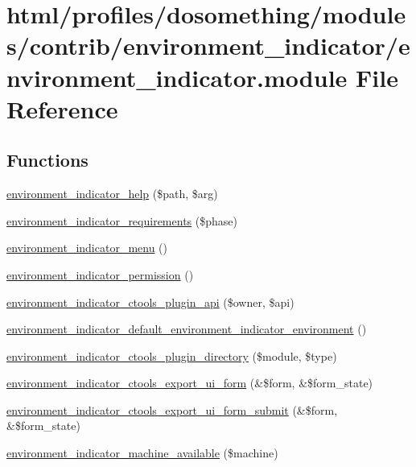 \hypertarget{environment__indicator_8module}{
\section{html/profiles/dosomething/modules/contrib/environment\_\-indicator/environment\_\-indicator.module File Reference}
\label{environment__indicator_8module}
}
\subsection*{Functions}
\begin{DoxyCompactItemize}
\item 
\hyperlink{environment__indicator_8module_adfcb16b3db44378c6a441b5fa7b551a6}{environment\_\-indicator\_\-help} (\$path, \$arg)
\item 
\hyperlink{environment__indicator_8module_ac2df292851fe032e8c1b8190b662efbb}{environment\_\-indicator\_\-requirements} (\$phase)
\item 
\hyperlink{environment__indicator_8module_a2bd8a22de9eff55b8b81e063f715c60d}{environment\_\-indicator\_\-menu} ()
\item 
\hyperlink{environment__indicator_8module_ac21e6775730d37b12c0777741024bdbb}{environment\_\-indicator\_\-permission} ()
\item 
\hyperlink{environment__indicator_8module_acd23f4e462d58e8faa7d37c70ae7c5f8}{environment\_\-indicator\_\-ctools\_\-plugin\_\-api} (\$owner, \$api)
\item 
\hyperlink{environment__indicator_8module_a2451c07621123ad9dd3ec1128c8a647b}{environment\_\-indicator\_\-default\_\-environment\_\-indicator\_\-environment} ()
\item 
\hyperlink{environment__indicator_8module_aa1ece2037e37ce2758dd6145f2f2eb80}{environment\_\-indicator\_\-ctools\_\-plugin\_\-directory} (\$module, \$type)
\item 
\hyperlink{environment__indicator_8module_a0eb9c2bff5825f46c4f21aaf3340ce98}{environment\_\-indicator\_\-ctools\_\-export\_\-ui\_\-form} (\&\$form, \&\$form\_\-state)
\item 
\hyperlink{environment__indicator_8module_a27eb1ea65ea1ecc4a24d1459bb404974}{environment\_\-indicator\_\-ctools\_\-export\_\-ui\_\-form\_\-submit} (\&\$form, \&\$form\_\-state)
\item 
\hyperlink{environment__indicator_8module_ab2f10d13a885a023ba462bc38e2df00f}{environment\_\-indicator\_\-machine\_\-available} (\$machine)

\end{DoxyCompactItemize}
